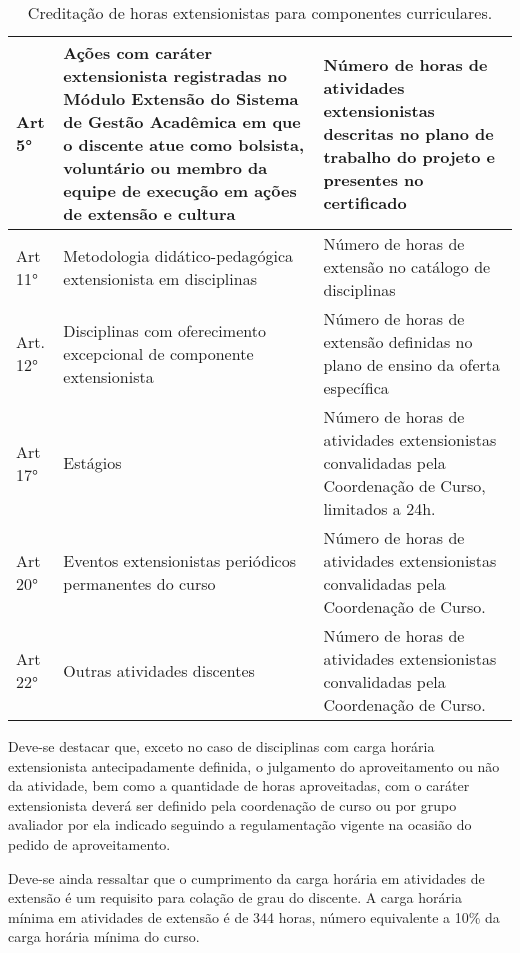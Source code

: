 \begin{table}[h!]
   \caption{Creditação de horas extensionistas para componentes curriculares.}
   \label{tab:componentes-ext}\centering
   \begin{tabular}{|p{}|p{}|p{}|}
      \hline
      Art 5°
      &
        Ações  com caráter  extensionista  registradas no  Módulo Extensão  do
        Sistema  de Gestão  Acadêmica em  que o  discente atue  como bolsista,
        voluntário ou  membro da  equipe de  execução em  ações de  extensão e
        cultura
      &
        Número de horas de atividades extensionistas descritas no plano de
        trabalho do projeto e presentes no certificado
      \\
      \hline
      Art 11°
      &
        Metodologia didático-pedagógica extensionista em disciplinas
      &
        Número de horas de extensão no catálogo de disciplinas
      \\
      \hline
      Art. 12°
      &
        Disciplinas com oferecimento excepcional de componente extensionista
      &
        Número de horas de extensão definidas no plano de ensino da oferta
        específica
      \\
      \hline
      Art 17°
      &
        Estágios
      &
        Número de horas de atividades extensionistas convalidadas pela
        Coordenação de Curso, limitados a 24h.
      \\
      \hline
      Art 20°
      &
        Eventos extensionistas periódicos permanentes do curso
      &
        Número  de  horas  de   atividades  extensionistas  convalidadas  pela
        Coordenação de Curso.
      \\
      \hline
      Art 22°
      &
        Outras atividades discentes
      &
        Número de horas de atividades extensionistas convalidadas pela
        Coordenação de Curso.
      \\
      \hline
    \end{tabular}
  \end{table}

Deve-se destacar que, exceto no caso de disciplinas com carga horária
extensionista antecipadamente definida, o julgamento do aproveitamento
ou não da atividade, bem como a quantidade de horas aproveitadas, com
o caráter extensionista deverá ser definido pela coordenação de curso
ou por grupo avaliador por ela indicado seguindo a regulamentação
vigente na ocasião do pedido de aproveitamento.

Deve-se ainda ressaltar que o cumprimento da carga horária em
atividades de extensão é um requisito para colação de grau do
discente. A carga horária mínima em atividades de extensão é de 344
horas, número equivalente a 10\% da carga horária mínima do curso.
